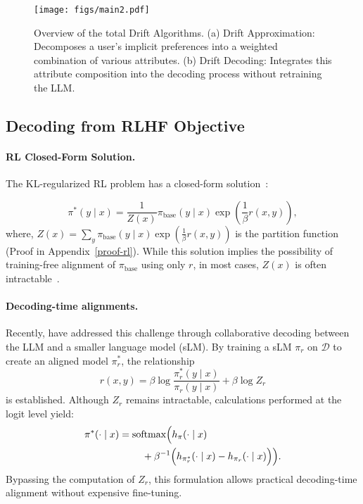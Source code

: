 \begin{figure*}[th]
    \centering
    \texttt{[image: figs/main2.pdf]}
    \caption{Overview of the total Drift Algorithms. (a) Drift Approximation: Decomposes a user’s implicit preferences into a weighted combination of various attributes. (b) Drift Decoding: Integrates this attribute composition into the decoding process without retraining the LLM.
    }
    \label{fig:main}
\vspace{-5mm}
\end{figure*}


\subsection{Decoding from RLHF Objective}

\paragraph{RL Closed-Form Solution.} The KL-regularized RL problem has a closed-form solution~\citep{korbak2022rl}:

{
\small
\begin{equation}
    \pi^*(y \mid x) = \frac{1}{Z(x)} \pi_{\text{base}}(y \mid x) \exp\left(\frac{1}{\beta} r(x, y)\right),
    \label{eq:ideal_distributions}
\end{equation}
}
where, $Z(x) = \sum_y \pi_{\text{base}}(y \mid x) \exp\left(\frac{1}{\beta} r(x, y)\right)$ is the partition function (Proof in Appendix~\ref{proof-rl}). While this solution implies the possibility of training-free alignment of $\pi_{\text{base}}$ using only $r$, in most cases, $Z(x)$ is often intractable~\citep{lin2022uncomputability}.

\paragraph{Decoding-time alignments.}
Recently, \citet{liu2024tuning, xu2024genarm, liu2024decoding} have addressed this challenge through collaborative decoding between the LLM and a smaller language model (sLM). By training a sLM $\pi_{r}$ on $\mathcal{D}$ to create an aligned model $\pi^*_{r}$, the relationship
\begin{equation}
r(x, y) = \beta\log\frac{\pi^*_r(y \mid x)}{\pi_{r}(y \mid x)} + \beta\log Z_r
\label{eq:generative_reward}
\end{equation}
is established. Although $Z_r$ remains intractable, calculations performed at the logit level yield:
\begin{equation}
\begin{split}
\pi^*(\cdot \mid x) =\; &\text{softmax}\Big( h_{\pi}(\cdot \mid x) \\
&\quad + \beta^{-1} \Bigl( h_{\pi^*_r}(\cdot \mid x) - h_{\pi_{r}}(\cdot \mid x) \Bigr) \Big).\nonumber
\end{split}
\label{eq:basic_decoding}
\end{equation}
Bypassing the computation of $Z_r$, this formulation allows practical decoding-time alignment without expensive fine-tuning.


